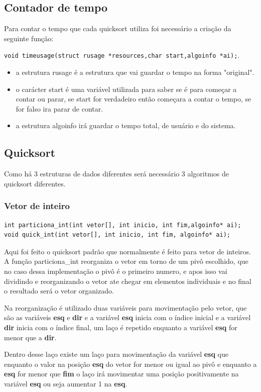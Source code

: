 \documentclass[11pt]{article}
\begin{document}
\subsection{Contador de tempo}
\label{sec:org32f7e7a}
Para contar o tempo que cada quicksort utiliza foi necessário a criação da seguinte função:

\texttt{void timeusage(struct rusage *resources,char start,algoinfo *ai);}.
\begin{itemize}
\item a estrutura rusage é a estrutura que vai guardar o tempo na forma "original".
\item o carácter start é uma variável utilizada para saber se é para começar a contar ou parar, se start for verdadeiro então começara a contar o tempo, se for falso ira parar de contar.
\item a estrutura algoinfo irá guardar o tempo total, de usuário e do sistema.
\end{itemize}
\subsection{Quicksort}
\label{sec:org8be48cf}
Como há 3 estruturas de dados diferentes será necessário 3 algoritmos de quicksort diferentes.
\subsubsection{Vetor de inteiro}
\label{sec:org587fcad}
\begin{verbatim}
int particiona_int(int vetor[], int inicio, int fim,algoinfo* ai);
void quick_int(int vetor[], int inicio, int fim, algoinfo* ai);
\end{verbatim}
Aqui foi feito o quicksort padrão que normalmente é feito para vetor de inteiros. A função particiona\_int reorganiza o vetor em torno de um pivô escolhido, que no caso dessa implementação o pivô é o primeiro numero, e apos isso vai dividindo e reorganizando o vetor ate chegar em elementos individuais e no final o resultado será o vetor organizado.

Na reorganização é utilizado duas variáveis para movimentação pelo vetor, que são as variáveis \textbf{esq} e \textbf{dir} e a variável \textbf{esq} inicia com o índice inicial e a variável \textbf{dir} inicia com o índice final, um laço é repetido enquanto a variável \textbf{esq} for menor que a \textbf{dir}. 

Dentro desse laço existe um laço para movimentação da variável \textbf{esq} que enquanto o valor na posição \textbf{esq} do vetor for menor ou igual ao pivô e enquanto a \textbf{esq} for menor que \textbf{fim} o laço irá movimentar uma posição positivamente na variável \textbf{esq} ou seja aumentar 1 na \textbf{esq}.
\end{document}
